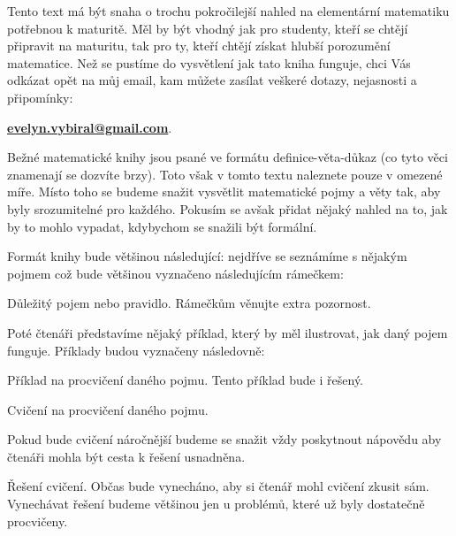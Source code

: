 

Tento text má být snaha o trochu pokročilejší nahled na elementární matematiku potřebnou k maturitě. Měl by být vhodný jak pro studenty, kteří se chtějí připravit na maturitu, tak pro ty, kteří chtějí získat hlubší porozumění matematice. Než se pustíme do vysvětlení jak tato kniha funguje, chci Vás odkázat opět na můj email, kam můžete zasílat veškeré dotazy, nejasnosti a připomínky: 
\begin{center}
  \textbf{\href{mailto: evelyn.vybiral@gmail.com}{evelyn.vybiral@gmail.com}}.
\end{center}
Bežné matematické knihy jsou psané ve formátu definice-věta-důkaz (co tyto věci znamenají se dozvíte brzy). Toto však v tomto textu naleznete pouze v omezené míře. Místo toho se budeme snažit vysvětlit matematické pojmy a věty tak, aby byly srozumitelné pro každého. Pokusím se avšak přidat nějaký nahled na to, jak by to mohlo vypadat, kdybychom se snažili být formální.

Formát knihy bude většinou následující: nejdříve se seznámíme s nějakým pojmem což bude většinou vyznačeno následujícím rámečkem:
\begin{definitionbox}
  Důležitý pojem nebo pravidlo. Rámečkům věnujte extra pozornost.
\end{definitionbox}
Poté čtenáři představíme nějaký příklad, který by měl ilustrovat, jak daný pojem funguje. Příklady budou vyznačeny následovně:
\begin{example}
  Příklad na procvičení daného pojmu. Tento příklad bude i řešený.
\end{example}
\begin{problem}
  Cvičení na procvičení daného pojmu. 
\end{problem}

\begin{hint}
  Pokud bude cvičení náročnější budeme se snažit vždy poskytnout nápovědu aby čtenáři mohla být cesta k řešení usnadněna.
\end{hint}

\begin{solution}
  Řešení cvičení. Občas bude vynecháno, aby si čtenář mohl cvičení zkusit sám. Vynechávat řešení budeme většinou jen u problémů, které už byly dostatečně procvičeny.
\end{solution}
